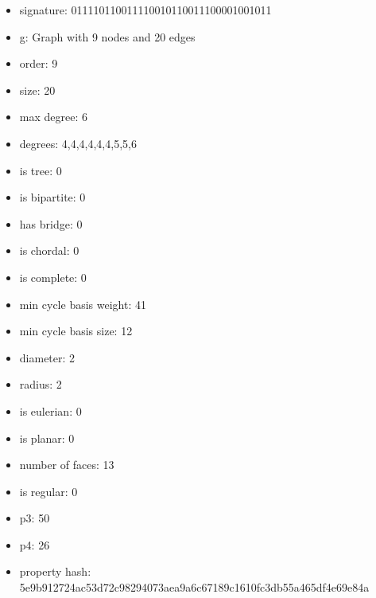 \newpage
\begin{figure}
\end{figure}
\begin{itemize}
\item signature: 011110110011110010110011100001001011
\item g: Graph with 9 nodes and 20 edges
\item order: 9
\item size: 20
\item max degree: 6
\item degrees: 4,4,4,4,4,4,5,5,6
\item is tree: 0
\item is bipartite: 0
\item has bridge: 0
\item is chordal: 0
\item is complete: 0
\item min cycle basis weight: 41
\item min cycle basis size: 12
\item diameter: 2
\item radius: 2
\item is eulerian: 0
\item is planar: 0
\item number of faces: 13
\item is regular: 0
\item p3: 50
\item p4: 26
\item property hash: 5e9b912724ac53d72c98294073aea9a6c67189c1610fc3db55a465df4e69e84a
\end{itemize}
